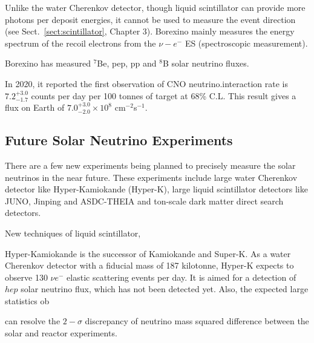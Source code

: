 Unlike the water Cherenkov detector, though liquid scintillator can provide more photons per deposit energies, it cannot be used to measure the event direction (see Sect.~\ref{sect:scintillator}, Chapter 3). Borexino mainly measures the energy spectrum of the recoil electrons from the $\nu-e^-$ ES (spectroscopic measurement).

Borexino has measured $^7$Be, pep, pp and $^8$B solar neutrino fluxes\cite{agostini2018comprehensive}. 

In 2020, it reported the first observation of CNO neutrino\cite{borexino2020experimental}.interaction rate is $7.2^{+3.0}_{-1.7}$ counts per day per 100 tonnes of target at 68\% C.L. This result gives a flux on Earth of $7.0^{+3.0}_{-2.0}\times 10^8$ cm$^{-2}$s$^{-1}$.

%

\subsection{Future Solar Neutrino Experiments}

There are a few new experiments being planned to precisely measure the solar neutrinos in the near future. These experiments include large water Cherenkov detector like Hyper-Kamiokande (Hyper-K), large liquid scintillator detectors like JUNO, Jinping and ASDC-THEIA and ton-scale dark matter direct search detectors. 

New techniques of liquid scintillator, 

Hyper-Kamiokande is the successor of Kamiokande and Super-K. As a water Cherenkov detector with a fiducial mass of 187 kilotonne, Hyper-K expects to observe 130 $\nu e^-$ elastic scattering events per day. It is aimed for a detection of $hep$ solar neutrino flux, which has not been detected yet. Also, the expected large statistics ob

 can resolve the $2-\sigma$ discrepancy of neutrino mass squared difference between the solar and reactor experiments. 

